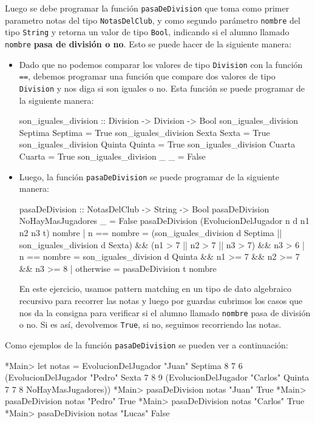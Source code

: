 \documentclass{article}
\begin{document}
Luego se debe programar la función \texttt{pasaDeDivision} que toma como primer parametro notas del tipo \texttt{NotasDelClub}, y como segundo parámetro \texttt{nombre} del tipo \texttt{String} y retorna un valor de tipo \texttt{Bool}, indicando si el alumno llamado \texttt{nombre} \textbf{pasa de división o no}. Esto se puede hacer de la siguiente manera:
\begin{itemize}
    \item Dado que no podemos comparar los valores de tipo \texttt{Division} con la función \texttt{==}, debemos programar una función que compare dos valores de tipo \texttt{Division} y nos diga si son iguales o no. Esta función se puede programar de la siguiente manera:
    \begin{haskell}
    son_iguales_division :: Division -> Division -> Bool
    son_iguales_division Septima Septima = True
    son_iguales_division Sexta Sexta = True
    son_iguales_division Quinta Quinta = True
    son_iguales_division Cuarta Cuarta = True
    son_iguales_division _ _ = False
    \end{haskell}
    \item Luego, la función \texttt{pasaDeDivision} se puede programar de la siguiente manera:
    \begin{haskell}
    pasaDeDivision :: NotasDelClub -> String -> Bool
    pasaDeDivision NoHayMasJugadores _ = False
    pasaDeDivision (EvolucionDelJugador n d n1 n2 n3 t) nombre
        | n == nombre = (son_iguales_division d Septima || son_iguales_division d Sexta) && (n1 > 7 || n2 > 7 || n3 > 7) && n3 > 6
        | n == nombre = son_iguales_division d Quinta && n1 >= 7 && n2 >= 7 && n3 >= 8
        | otherwise = pasaDeDivision t nombre
    \end{haskell}
    En este ejercicio, usamos pattern matching en un tipo de dato algebraico recursivo para recorrer las notas y luego por guardas cubrimos los casos que nos da la consigna para verificar si el alumno llamado \texttt{nombre} pasa de división o no. Si es así, devolvemos \texttt{True}, si no, seguimos recorriendo las notas.
\end{itemize}
Como ejemplos de la función \texttt{pasaDeDivision} se pueden ver a continuación:
\begin{haskell}
*Main> let notas = EvolucionDelJugador "Juan" Septima 8 7 6 (EvolucionDelJugador "Pedro" Sexta 7 8 9 (EvolucionDelJugador "Carlos" Quinta 7 7 8 NoHayMasJugadores))
*Main> pasaDeDivision notas "Juan"
True
*Main> pasaDeDivision notas "Pedro"
True
*Main> pasaDeDivision notas "Carlos"
True
*Main> pasaDeDivision notas "Lucas"
False
\end{haskell}
\end{document}
